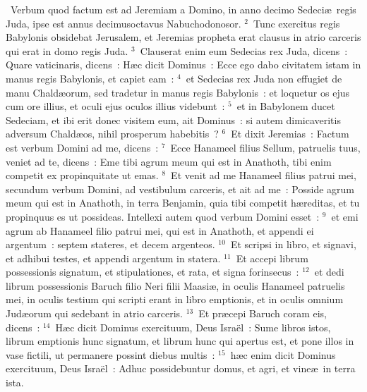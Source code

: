 ~Verbum quod factum est ad Jeremiam a Domino, in anno decimo Sedeci\ae\ regis Juda, ipse est annus decimusoctavus Nabuchodonosor.
${}^{2}$~Tunc exercitus regis Babylonis obsidebat Jerusalem, et Jeremias propheta erat clausus in atrio carceris qui erat in domo regis Juda.
${}^{3}$~Clauserat enim eum Sedecias rex Juda, dicens~: Quare vaticinaris, dicens~: H\ae c dicit Dominus~: Ecce ego dabo civitatem istam in manus regis Babylonis, et capiet eam~:
${}^{4}$~et Sedecias rex Juda non effugiet de manu Chald\ae orum, sed tradetur in manus regis Babylonis~: et loquetur os ejus cum ore illius, et oculi ejus oculos illius videbunt~:
${}^{5}$~et in Babylonem ducet Sedeciam, et ibi erit donec visitem eum, ait Dominus~: si autem dimicaveritis adversum Chald\ae os, nihil prosperum habebitis~?
${}^{6}$~Et dixit Jeremias~: Factum est verbum Domini ad me, dicens~:
${}^{7}$~Ecce Hanameel filius Sellum, patruelis tuus, veniet ad te, dicens~: Eme tibi agrum meum qui est in Anathoth, tibi enim competit ex propinquitate ut emas.
${}^{8}$~Et venit ad me Hanameel filius patrui mei, secundum verbum Domini, ad vestibulum carceris, et ait ad me~: Posside agrum meum qui est in Anathoth, in terra Benjamin, quia tibi competit h\ae reditas, et tu propinquus es ut possideas. Intellexi autem quod verbum Domini esset~:
${}^{9}$~et emi agrum ab Hanameel filio patrui mei, qui est in Anathoth, et appendi ei argentum~: septem stateres, et decem argenteos.
${}^{10}$~Et scripsi in libro, et signavi, et adhibui testes, et appendi argentum in statera.
${}^{11}$~Et accepi librum possessionis signatum, et stipulationes, et rata, et signa forinsecus~:
${}^{12}$~et dedi librum possessionis Baruch filio Neri filii Maasi\ae , in oculis Hanameel patruelis mei, in oculis testium qui scripti erant in libro emptionis, et in oculis omnium Jud\ae orum qui sedebant in atrio carceris.
${}^{13}$~Et pr\ae cepi Baruch coram eis, dicens~:
${}^{14}$~H\ae c dicit Dominus exercituum, Deus Isra\"el~: Sume libros istos, librum emptionis hunc signatum, et librum hunc qui apertus est, et pone illos in vase fictili, ut permanere possint diebus multis~:
${}^{15}$~h\ae c enim dicit Dominus exercituum, Deus Isra\"el~: Adhuc possidebuntur domus, et agri, et vine\ae\ in terra ista.


